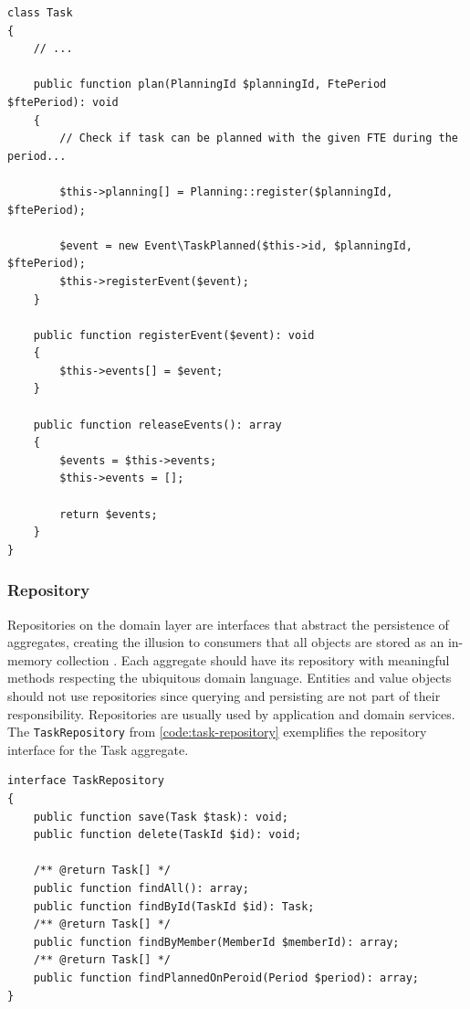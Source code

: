 \begin{listing}[htbp]
\begin{verbatim}
class Task
{
    // ...

    public function plan(PlanningId $planningId, FtePeriod $ftePeriod): void
    {
	    // Check if task can be planned with the given FTE during the period...

		$this->planning[] = Planning::register($planningId, $ftePeriod);

		$event = new Event\TaskPlanned($this->id, $planningId, $ftePeriod);
		$this->registerEvent($event);
    }

	public function registerEvent($event): void
	{
		$this->events[] = $event;
	}

	public function releaseEvents(): array
	{
		$events = $this->events;
		$this->events = [];

		return $events;
	}
}
\end{verbatim}
\caption{Example of the \texttt{Task} entity coordinating the \texttt{TaskPlanned} event.}
\label{code:domain-event-on-entity}
\end{listing}

\subsubsection{Repository}
\label{sec:repository-interface}

Repositories on the domain layer are interfaces that abstract the persistence of aggregates, creating the illusion to consumers that all objects are stored as an in-memory collection \cite{ddd-blue-book}. Each aggregate should have its repository with meaningful methods respecting the ubiquitous domain language. Entities and value objects should not use repositories since querying and persisting are not part of their responsibility. Repositories are usually used by application and domain services. The \texttt{TaskRepository} from \autoref{code:task-repository} exemplifies the repository interface for the Task aggregate.

\begin{listing}[htbp]
\begin{verbatim}
interface TaskRepository
{
    public function save(Task $task): void;
    public function delete(TaskId $id): void;

    /** @return Task[] */
    public function findAll(): array;
    public function findById(TaskId $id): Task;
	/** @return Task[] */
	public function findByMember(MemberId $memberId): array;
    /** @return Task[] */
	public function findPlannedOnPeroid(Period $period): array;
}
\end{verbatim}
\caption{Task repository interface.}
\label{code:task-repository}
\end{listing}

